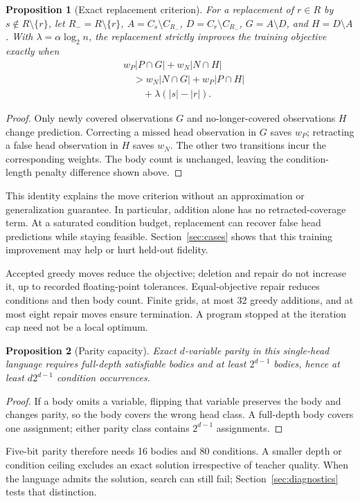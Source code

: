 \documentclass[a4paper,fleqn,review]{cas-sc}
\newtheorem{proposition}{Proposition}
\begin{document}
\begin{proposition}[Exact replacement criterion]
For a replacement of $r\in R$ by $s\notin R\setminus\{r\}$, let $R_-=R\setminus\{r\}$, $A=C_s\setminus C_{R_-}$, $D=C_r\setminus C_{R_-}$, $G=A\setminus D$, and $H=D\setminus A$. With $\lambda=\alpha\log_2 n$, the replacement strictly improves the training objective exactly when
\begin{equation}
\begin{aligned}
&w_P|P\cap G|+w_N|N\cap H|\\
&\quad >w_N|N\cap G|+w_P|P\cap H|\\
&\qquad +\lambda(|s|-|r|).
\end{aligned}
\end{equation}
\end{proposition}
\begin{proof}
Only newly covered observations $G$ and no-longer-covered observations $H$ change prediction. Correcting a missed head observation in $G$ saves $w_P$; retracting a false head observation in $H$ saves $w_N$. The other two transitions incur the corresponding weights. The body count is unchanged, leaving the condition-length penalty difference shown above.
\end{proof}
This identity explains the move criterion without an approximation or generalization guarantee. In particular, addition alone has no retracted-coverage term. At a saturated condition budget, replacement can recover false head predictions while staying feasible. Section~\ref{sec:cases} shows that this training improvement may help or hurt held-out fidelity.

Accepted greedy moves reduce the objective; deletion and repair do not increase it, up to recorded floating-point tolerances. Equal-objective repair reduces conditions and then body count. Finite grids, at most 32 greedy additions, and at most eight repair moves ensure termination. A program stopped at the iteration cap need not be a local optimum.

\begin{proposition}[Parity capacity]
Exact $d$-variable parity in this single-head language requires full-depth satisfiable bodies and at least $2^{d-1}$ bodies, hence at least $d2^{d-1}$ condition occurrences.
\end{proposition}
\begin{proof}
If a body omits a variable, flipping that variable preserves the body and changes parity, so the body covers the wrong head class. A full-depth body covers one assignment; either parity class contains $2^{d-1}$ assignments.
\end{proof}
Five-bit parity therefore needs 16 bodies and 80 conditions. A smaller depth or condition ceiling excludes an exact solution irrespective of teacher quality. When the language admits the solution, search can still fail; Section~\ref{sec:diagnostics} tests that distinction.
\end{document}
